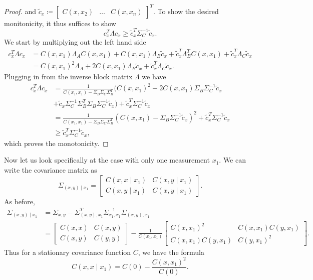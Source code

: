 \begin{proof}
and 
\( \tilde{c}_{x} \coloneqq \begin{bmatrix} C(x,x_{2}) &  \dots & C(x,x_{n}) \end{bmatrix}^{T} \).
To show the desired monitonicity, it thus suffices to show 
\[
    c_{x}^{T}\Lambda c_{x} \geq \tilde{c}_{x}^{T} \Sigma_{C}^{-1} \tilde{c}_{x}.
\]
We start by multiplying out the left hand side
\begin{align*}
    c_{x}^{T} \Lambda c_{x} &= C(x,x_{1}) \Lambda_{A} C(x,x_{1}) + C(x,x_{1}) \Lambda_{B} \tilde{c}_{x} + \tilde{c}_{x}^{T} \Lambda_{B}^{T} C(x,x_{1}) + \tilde{c}_{x}^{T} \Lambda_{C} \tilde{c}_{x} \\
    &= C(x,x_{1})^2 \Lambda_{A} + 2 C(x,x_{1}) \Lambda_{B} \tilde{c}_{x} + \tilde{c}_{x}^{T} \Lambda_{C} \tilde{c}_{x}.
\end{align*}
Plugging in from the inverse block matrix $\Lambda$ we have
\begin{align*}
    c_{x}^{T} \Lambda c_{x} &= \frac{1}{C(x_{1},x_{1})-\Sigma_{B}\Sigma_{C}\Sigma_{B}^{T}} ( C(x,x_{1})^2 - 2 C(x,x_{1}) \Sigma_{B} \Sigma_{C}^{-1} \tilde{c}_{x} \\
    & +\tilde{c}_{x} \Sigma_{C}^{-1} \Sigma_{B}^{T} \Sigma_{B}\Sigma_{C}^{-1} \tilde{c}_{x} ) + \tilde{c}_{x}^{T} \Sigma_{C}^{-1} \tilde{c}_{x}\\
    &= \frac{1}{C(x_{1},x_{1})-\Sigma_{B}\Sigma_{C}\Sigma_{B}^{T}} \left( C(x,x_{1})- \Sigma_{B} \Sigma_{C}^{-1} \tilde{c}_{x}  \right)^2 +\tilde{c}_{x}^{T} \Sigma_{C}^{-1} \tilde{c}_{x} \\
    &\geq \tilde{c}_{x}^{T} \Sigma_{C}^{-1} \tilde{c}_{x},
\end{align*}
which proves the monotonicity.
\end{proof}
%
%
Now let us look specifically at the case with only one measurement $x_{1}$. We can write the covariance matrix as
\[
    \Sigma_{(x,y) \mid x_{1}} = \begin{bmatrix}
    C(x,x \mid x_{1}) & C(x,y \mid x_{1}) \\
    C(x,y \mid x_{1}) & C(x,y \mid x_{1}) 
    \end{bmatrix}.
\]
As before,
\begin{align*}
    \Sigma_{(x,y) \mid x_{1}} &= \Sigma_{x,y} - \Sigma_{(x,y), x_{1}}^{T} \Sigma_{x_{1},x_{1}}^{-1} \Sigma_{(x,y), x_{1}}\\
    &= \begin{bmatrix}
    C(x,x) & C(x,y)\\
    C(x,y) & C(y,y)
    \end{bmatrix}
    - \frac{1}{C(x_{1},x_{1})}
    \begin{bmatrix}
    C(x,x_{1})^2            & C(x,x_{1}) C(y,x_{1}) \\
    C(x,x_{1}) C(y,x_{1})   & C(y,x_{1})^2
    \end{bmatrix}.
\end{align*}
Thus for a stationary covariance function $C$, we have the formula
\[
    C(x,x \mid x_{1}) = C(0) - \frac{C(x,x_{1})^2}{C(0)}.
\]

